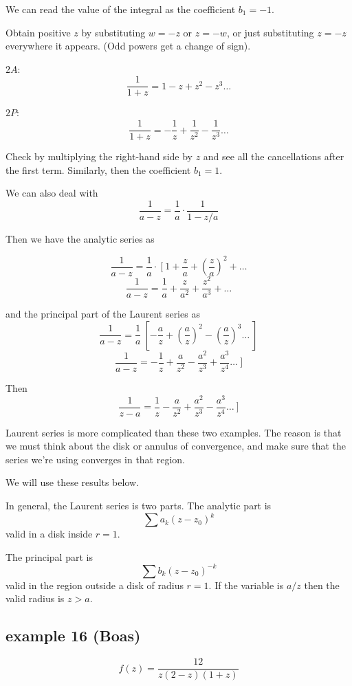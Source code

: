 \documentclass[11pt, oneside]{article}
\begin{document}
We can read the value of the integral as the coefficient $b_1 = -1$.

Obtain positive $z$ by substituting $w = -z$ or $z = -w$, or just substituting $z = -z$ everywhere it appears.  (Odd powers get a change of sign).

$2A$:
\[ \frac{1}{1 + z} = 1 - z + z^2 - z^3 \dots \]

$2P$:
\[ \frac{1}{1 + z} = - \frac{1}{z} + \frac{1}{z^2} - \frac{1}{z^3} \dots \]

Check by multiplying the right-hand side by $z$ and see all the cancellations after the first term.  Similarly, then the coefficient $b_1 = 1$.

We can also deal with 
\[ \frac{1}{a - z} = \frac{1}{a} \cdot \frac{1}{1 - z/a} \]

Then we have the analytic series as 

\[ \frac{1}{a - z} = \frac{1}{a} \cdot \ [ \ 1 +  \frac{z}{a} + (\frac{z}{a})^2 + \dots  \]
\[ \frac{1}{a - z} = \frac{1}{a} +  \frac{z}{a^2} +  \frac{z^2}{a^3} + \dots \]

and the principal part of the Laurent series as
\[ \frac{1}{a - z} = \frac{1}{a} \ [ - \frac{a}{z} + (\frac{a}{z})^2 - (\frac{a}{z})^3 \dots \ ]  \]
\[ \frac{1}{a - z} = - \frac{1}{z} + \frac{a}{z^2} - \frac{a^2}{z^3} + \frac{a^3}{z^4} \dots \ ]  \]

Then
\[ \frac{1}{z - a} = \frac{1}{z} - \frac{a}{z^2} + \frac{a^2}{z^3} - \frac{a^3}{z^4} \dots \ ]  \]

Laurent series is more complicated than these two examples.  The reason is that we must think about the disk or annulus of convergence, and make sure that the series we're using converges in that region.

We will use these results below.

In general, the Laurent series is two parts.  The analytic part is
\[ \sum a_k (z - z_0)^k \]
valid in a disk inside $r = 1$.

The principal part is
\[ \sum b_k (z - z_0)^{-k} \]
valid in the region outside a disk of radius $r = 1$.  If the variable is $a/z$ then the valid radius is $z > a$.

\subsection*{example 16 (Boas)}

\label{sec:ex16L}

\[ f(z) = \frac{12}{z(2 - z)(1 + z)} \]
\end{document}
